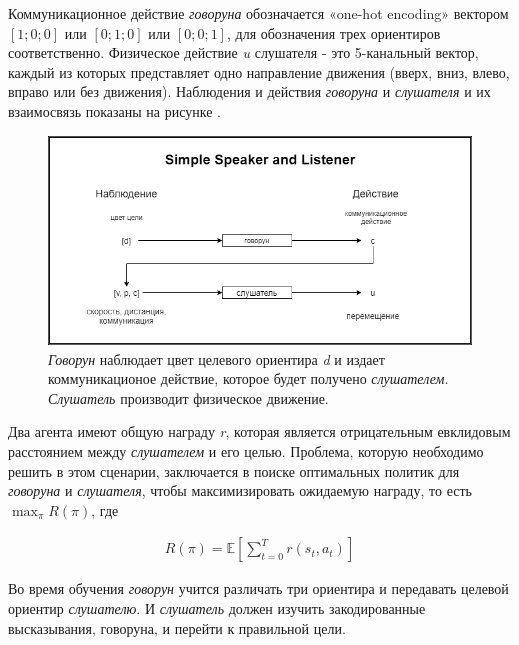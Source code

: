 Коммуникационное действие \textit{говоруна} обозначается «one-hot encoding» вектором $[1; 0; 0]$ или $[0; 1; 0]$ или $[0; 0; 1]$, для обозначения трех ориентиров соответственно.
Физическое действие \textit{u} слушателя - это 5-канальный вектор, каждый из которых представляет одно направление движения (вверх, вниз, влево, вправо или без движения). Наблюдения и действия \textit{говоруна} и \textit{слушателя} и их взаимосвязь показаны на рисунке .

\begin{figure}[ht!]
    \center
    \includegraphics [scale=0.60] {my_folder/images/ch4/simple_speaker_listener.png}
    \caption{\textit{Говорун} наблюдает цвет целевого ориентира \textit{d} и издает коммуникационое действие, которое будет получено \textit{слушателем}. \textit{Слушатель} производит физическое движение.}
    \label{fig:ch4-ssl}
\end{figure}

Два агента имеют общую награду \textit{r}, которая является отрицательным евклидовым расстоянием между \textit{слушателем} и его целью. Проблема, которую необходимо решить в этом сценарии, заключается в поиске оптимальных политик для \textit{говоруна} и \textit{слушателя}, чтобы максимизировать ожидаемую награду, то есть $\max_{\pi}R(\pi)$, где

\begin{equation}
    \begin{multlined}
        R(\pi) = \mathbb{E}[\sum_{t=0}^{T}r(s_t, a_t)]
    \end{multlined}
\end{equation}

Во время обучения \textit{говорун} учится различать три ориентира и передавать целевой ориентир \textit{слушателю}. И \textit{слушатель} должен изучить закодированные высказывания, говоруна, и перейти к правильной цели.

